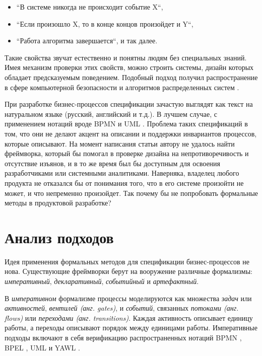 \documentclass[14pt, openany]{report}
\begin{document}
\begin{itemize}
  \item ``В системе никогда не происходит событие X``,
  \item ``Если произошло X, то в конце концов произойдет и Y``, 
  \item ``Работа алгоритма завершается``, и так далее. 
\end{itemize}

Такие свойства звучат естественно и понятны людям без специальных знаний. Имея механизм проверки этих свойств, можно строить системы, дизайн которых обладает предсказуемым поведением. Подобный подход получил распространение в сфере компьютерной безопасности \cite{formalSecure} и алгоритмов распределенных систем \cite{formalAlg}. 

При разработке бизнес-процессов спецификации зачастую выглядят как текст на натуральном языке (русский, английский и т.д.). В лучшем случае, с применением нотаций вроде BPMN \cite{bpmn} и UML \cite{uml}. Проблема таких спецификаций в том, что они не делают акцент на описании и поддержки инвариантов процессов, которые описывают. На момент написания статьи автору не удалось найти фреймворка, который бы помогал в проверке дизайна на непротиворечивость и отсутствие изъянов, и в то же время был бы доступным для освоения разработчиками или системными аналитиками.
Наверняка, владелец любого продукта не отказался бы от понимания того, что в его системе произойти не может, и что непременно произойдет.
Так почему бы не попробовать формальные методы в продуктовой разработке?


\section{Анализ подходов}
Идея применения формальных методов для спецификации бизнес-процессов не нова. Существующие фреймворки берут на вооружение различные формализмы: \emph{императивный}, \emph{декларативный}, \emph{событийный} и \emph{артефактный}. 

В \emph{императивном} формализме процессы моделируются как множества \emph{задач} или \emph{активностей}, \emph{вентилей (анг. gates)}, и \emph{событий}, связанных \emph{потоками (анг. flows)} или \emph{переходами (анг. transitions)}. Каждая активность описывает единицу работы, а переходы описывают порядок между единицами работы. Императивные подходы включают в себя верификацию распространенных нотаций BPMN \cite{specBPMN}, BPEL \cite{specBPEL}, UML \cite{specUML} и YAWL \cite{specYAWL}. 
\end{document}
